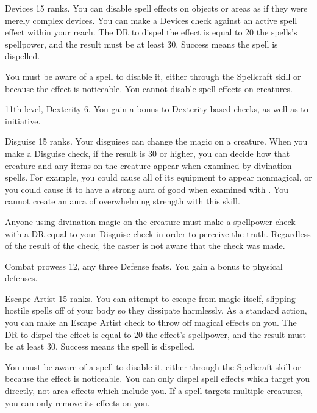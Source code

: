 \featpre Devices 15 ranks.
\featben You can disable spell effects on objects or areas as if they were merely complex devices.
You can make a Devices check against an active spell effect within your reach.
The DR to dispel the effect is equal to 20 \add the spells's spellpower, and the result must be at least 30.
Success means the spell is dispelled.

You must be aware of a spell to disable it, either through the Spellcraft skill or because the effect is noticeable.
You cannot disable spell effects on creatures.

\featpres 11th level, Dexterity 6.
\featben You gain a  bonus to Dexterity-based checks, as well as to initiative.

\featpre Disguise 15 ranks.
\featben Your disguises can change the magic on a creature.
When you make a Disguise check, if the result is 30 or higher, you can decide how that creature and any items on the creature appear when examined by divination spells.
For example, you could cause all of its equipment to appear nonmagical, or you could cause it to have a strong aura of good when examined with .
You cannot create an aura of overwhelming strength with this skill.

Anyone using divination magic on the creature must make a spellpower check with a DR equal to your Disguise check in order to perceive the truth.
Regardless of the result of the check, the caster is not aware that the check was made.

\featpres Combat prowess 12, any three Defense feats.
\featben You gain a  bonus to physical defenses.

\featpre Escape Artist 15 ranks.
\featben You can attempt to escape from magic itself, slipping hostile spells off of your body so they dissipate harmlessly.
As a standard action, you can make an Escape Artist check to throw off magical effects on you.
The DR to dispel the effect is equal to 20 \add the effect's spellpower, and the result must be at least 30.
Success means the spell is dispelled.

You must be aware of a spell to disable it, either through the Spellcraft skill or because the effect is noticeable.
You can only dispel spell effects which target you directly, not area effects which include you.
If a spell targets multiple creatures, you can only remove its effects on you.

